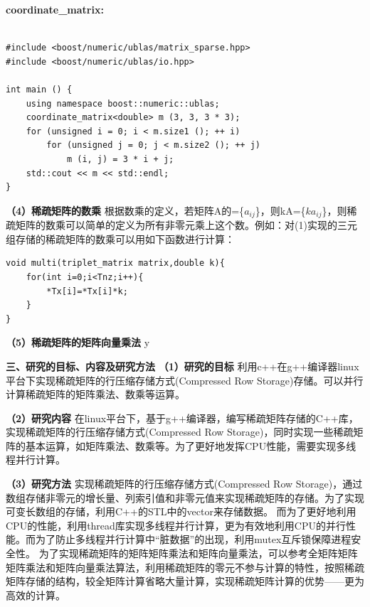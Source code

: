 \documentclass{article}
\begin{document}
\textbf{coordinate\_matrix:}
\begin{lstlisting}

#include <boost/numeric/ublas/matrix_sparse.hpp>
#include <boost/numeric/ublas/io.hpp>

int main () {
    using namespace boost::numeric::ublas;
    coordinate_matrix<double> m (3, 3, 3 * 3);
    for (unsigned i = 0; i < m.size1 (); ++ i)
        for (unsigned j = 0; j < m.size2 (); ++ j)
            m (i, j) = 3 * i + j;
    std::cout << m << std::endl;
}
\end{lstlisting}

\textbf{（4）稀疏矩阵的数乘}
      \qquad
\newline
根据数乘的定义，若矩阵A的=\{$a_{ij}$\}，则kA=\{$ka_{ij}$\}，则稀疏矩阵的数乘可以简单的定义为所有非零元乘上这个数。例如：对(1)实现的三元组存储的稀疏矩阵的数乘可以用如下函数进行计算：
\begin{lstlisting}
void multi(triplet_matrix matrix,double k){
	for(int i=0;i<Tnz;i++){
		*Tx[i]=*Tx[i]*k;
	}
}
\end{lstlisting}

\textbf{（5）稀疏矩阵的矩阵向量乘法}
      \qquad
\newline
y


\textbf{三、研究的目标、内容及研究方法}
      \qquad
\newline
\textbf{（1）研究的目标}
      \qquad
\newline
利用c++在g++编译器linux平台下实现稀疏矩阵的行压缩存储方式(Compressed Row Storage)存储。可以并行计算稀疏矩阵的矩阵乘法、数乘等运算。
\newline

\textbf{（2）研究内容}
      \qquad
\newline
 在linux平台下，基于g++编译器，编写稀疏矩阵存储的C++库，实现稀疏矩阵的行压缩存储方式(Compressed Row Storage)，同时实现一些稀疏矩阵的基本运算，如矩阵乘法、数乘等。为了更好地发挥CPU性能，需要实现多线程并行计算。

\textbf{（3）研究方法}
      \qquad
\newline
实现稀疏矩阵的行压缩存储方式(Compressed Row Storage)，通过数组存储非零元的增长量、列索引值和非零元值来实现稀疏矩阵的存储。为了实现可变长数组的存储，利用C++的STL中的vector来存储数据。
\newline
而为了更好地利用CPU的性能，利用thread库实现多线程并行计算，更为有效地利用CPU的并行性能。而为了防止多线程并行计算中“脏数据”的出现，利用mutex互斥锁保障进程安全性。
\newline
为了实现稀疏矩阵的矩阵矩阵乘法和矩阵向量乘法，可以参考全矩阵矩阵矩阵乘法和矩阵向量乘法算法，利用稀疏矩阵的零元不参与计算的特性，按照稀疏矩阵存储的结构，较全矩阵计算省略大量计算，实现稀疏矩阵计算的优势——更为高效的计算。
\newline
\end{document}
